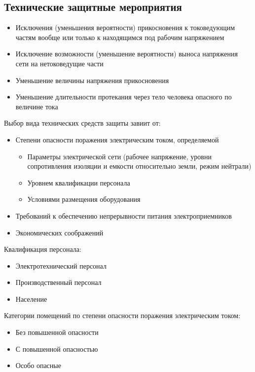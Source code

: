 \documentclass[a4paper, 14pt]{extarticle}
\begin{document}
\subsection{Технические защитные мероприятия}
\begin{itemize}
    \item Исключения (уменьшения вероятности) прикосновения к токоведующим частям вообще или только к находящимся под рабочим напряжением
    \item Исключение возможности (уменьшение вероятности) выноса напряжения сети на нетоковедущие части
    \item Уменьшение величины напряжения прикосновения
    \item Уменьшение длительности протекания через тело человека опасного по величине тока
\end{itemize}

Выбор вида технических средств защиты завиит от:
\begin{itemize}
    \item Степени опасности поражения электрическим током, определяемой
    \begin{itemize}
        \item Параметры электрической сети (рабочее напряжение, уровни сопротивления изоляции и емкости относительно земли, режим нейтрали)
        \item Уровнем квалификации персонала
        \item Условиями размещения оборудования
    \end{itemize}
    \item Требований к обеспечению непрерывности питания электроприемников
    \item Экономических соображений
\end{itemize}

Квалификация персонала:
\begin{itemize}
    \item Электротехнический персонал
    \item Производственный персонал
    \item Население
\end{itemize}

Категории помещений по степени опасности поражения электрическим током:
\begin{itemize}
    \item Без повышенной опасности
    \item С повышенной опасностью
    \item Особо опасные
\end{itemize}
\end{document}
